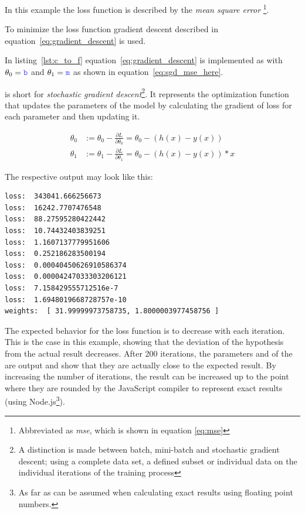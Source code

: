 In this example the loss function is described by the \textit{mean square error } \footnote{ Abbreviated as \textit{mse}, which is shown in equation \eqref{eq:mse}}.

To minimize the loss function gradient descent described in equation~\eqref{eq:gradient_descent} is used.

In listing~\ref{lst:c_to_f} equation~\eqref{eq:gradient_descent} is implemented as  with $\theta_0 = \code{b}$ and $\theta_1= \code{m}$ as shown in equation~\eqref{eq:sgd_mse_here}.

 is short for \textit{stochastic gradient descent}\footnote{A distinction is made between batch, mini-batch and stochastic gradient descent; using a complete data set, a defined subset or individual data on the individual iterations of the training process}.
It represents the optimization function that updates the parameters of the model by calculating the gradient of loss for each parameter and then updating it.

\begin{equation}
    \begin{split}
        \theta_{0} & := \theta_{0} - \frac{\partial L}{\partial \theta_{0}} =
        \theta_{0} - (h(x) - y(x))  \\
        \theta_{1} & := \theta_{1} - \frac{\partial L}{\partial \theta_{1}} =
        \theta_{0} - (h(x) - y(x)) * x
    \end{split}
    \label{eq:sgd_mse_here}
\end{equation}

The respective output may look like this:
\begin{lstlisting}
loss:  343041.666256673
loss:  16242.7707476548
loss:  88.27595280422442
loss:  10.74432403839251
loss:  1.1607137779951606
loss:  0.252186283500194
loss:  0.00040450626910586374
loss:  0.00004247033303206121
loss:  7.158429555712516e-7
loss:  1.6948019668728757e-10
weights:  [ 31.99999973758735, 1.8000003977458756 ]
\end{lstlisting} 

The expected behavior for the loss function is to decrease with each iteration.
This is the case in this example, showing that the deviation of the hypothesis from the actual result decreases.
After 200 iterations, the parameters  and  of the  are output and show that they are actually close to the expected result.
By increasing the number of iterations, the result can be increased up to the point where they are rounded by the JavaScript compiler to represent exact results (using Node.js\footnote{As far as can be assumed when calculating exact results using floating point numbers.}).

